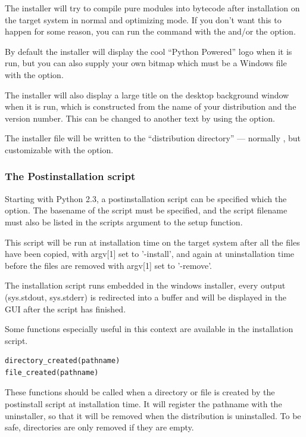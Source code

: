 \documentclass{howto}
\begin{document}
The installer will try to compile pure modules into bytecode after
installation on the target system in normal and optimizing mode.  If
you don't want this to happen for some reason, you can run the
 command with the
 and/or the
 option.

By default the installer will display the cool ``Python Powered'' logo
when it is run, but you can also supply your own bitmap which must be
a Windows  file with the  option.

The installer will also display a large title on the desktop
background window when it is run, which is constructed from the name
of your distribution and the version number.  This can be changed to
another text by using the  option.

The installer file will be written to the ``distribution directory''
--- normally , but customizable with the
 option.

\subsubsection{The Postinstallation script}
\label{postinstallation-script}

Starting with Python 2.3, a postinstallation script can be specified
which the  option.  The basename of the
script must be specified, and the script filename must also be listed
in the scripts argument to the setup function.

This script will be run at installation time on the target system
after all the files have been copied, with argv[1] set to '-install',
and again at uninstallation time before the files are removed with argv[1]
set to '-remove'.

The installation script runs embedded in the windows installer, every
output (sys.stdout, sys.stderr) is redirected into a buffer and will
be displayed in the GUI after the script has finished.

Some functions especially useful in this context are available in the
installation script.

\begin{verbatim}
directory_created(pathname)
file_created(pathname)
\end{verbatim}

These functions should be called when a directory or file is created
by the postinstall script at installation time.  It will register the
pathname with the uninstaller, so that it will be removed when the
distribution is uninstalled.  To be safe, directories are only removed
if they are empty.
\end{document}
